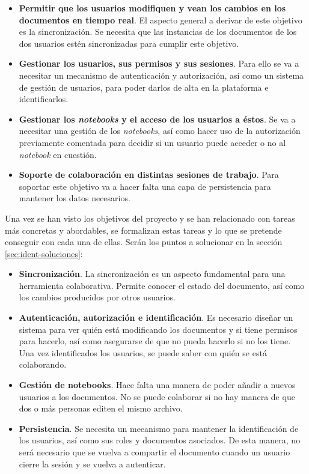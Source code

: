 \documentclass[11pt,spanish,listoffigures]{tfgetsinf}
\begin{document}
\begin{itemize}

\item \textbf{Permitir que los usuarios modifiquen y vean los cambios en los documentos en tiempo real}. El aspecto general a derivar de este objetivo es la sincronización. Se necesita que las instancias de los documentos de los dos usuarios estén sincronizadas para cumplir este objetivo.

\item \textbf{Gestionar los usuarios, sus permisos y sus sesiones}. Para ello se va a necesitar un mecanismo de autenticación y autorización, así como un sistema de gestión de usuarios, para poder darlos de alta en la plataforma e identificarlos.

\item \textbf{Gestionar los \textit{notebooks} y el acceso de los usuarios a éstos}. Se va a necesitar una gestión de los \textit{notebooks}, así como hacer uso de la autorización previamente comentada para decidir si un usuario puede acceder o no al \textit{notebook} en cuestión.

\item \textbf{Soporte de colaboración en distintas sesiones de trabajo}. Para soportar este objetivo va a hacer falta una capa de persistencia para mantener los datos necesarios.
\end{itemize}

Una vez se han visto los objetivos del proyecto y se han relacionado con tareas más concretas y abordables, se formalizan estas tareas y lo que se pretende conseguir con cada una de ellas. Serán los puntos a solucionar en la sección \ref{sec:ident-soluciones}:

\begin{itemize}
\item \textbf{Sincronización}. La sincronización es un aspecto fundamental para una herramienta colaborativa. Permite conocer el estado del documento, así como los cambios producidos por otros usuarios. 


\item \textbf{Autenticación, autorización e identificación}. Es necesario diseñar un sistema para ver quién está modificando los documentos y si tiene permisos para hacerlo, así como asegurarse de que no pueda hacerlo si no los tiene. Una vez identificados los usuarios, se puede saber con quién se está colaborando.

\item \textbf{Gestión de notebooks}. Hace falta una manera de poder añadir a nuevos usuarios a los documentos. No se puede  colaborar si no hay manera de que dos o más personas editen el mismo archivo.

\item \textbf{Persistencia}. Se necesita un mecanismo para mantener la identificación de los usuarios, así como sus roles y documentos asociados. De esta manera, no será necesario que se vuelva a compartir el documento cuando un usuario cierre la sesión y se vuelva a autenticar.

\end{itemize}
\end{document}
